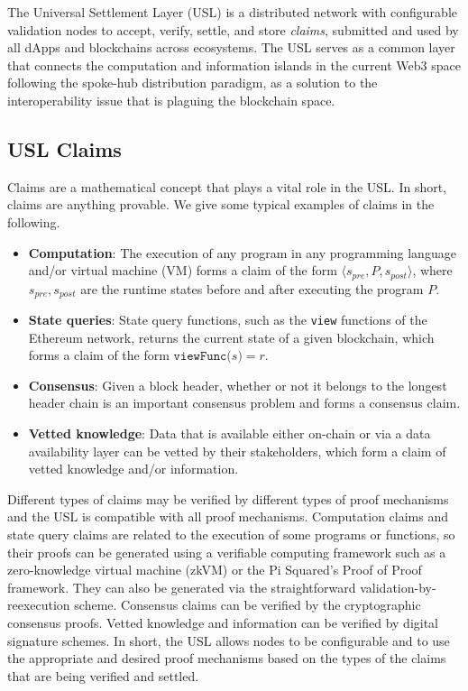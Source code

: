 \documentclass{article}
\newcommand{\spre}{s_\textit{pre}}
\newcommand{\spost}{s_\textit{post}}
\begin{document}
The Universal Settlement Layer (USL) is a distributed network with configurable validation nodes to accept, verify, settle, and store \emph{claims}, submitted and used by all dApps and blockchains across ecosystems. 
The USL serves as a common layer that connects the computation and information islands in the current Web3 space following the spoke-hub distribution paradigm,
as a solution to the interoperability issue that is plaguing the blockchain space. 

\subsection{USL Claims}
\label{sec:usl:claims}

Claims are a mathematical concept that plays a vital role in the USL. 
In short, claims are anything provable. 
We give some typical examples of claims in the following. 
\begin{itemize}
    \item \textbf{Computation}: The execution of any program in any programming language and/or virtual machine (VM) forms a claim of the form $\langle \spre , P , \spost \rangle$,
    where $\spre,\spost$ are the runtime states before and after executing the program $P$. 
    \item \textbf{State queries}: State query functions, such as the \texttt{view} functions of the Ethereum network,
    returns the current state of a given blockchain, which forms a claim of the form $\texttt{viewFunc($s$)} = r$.
    \item \textbf{Consensus}: Given a block header, whether or not it belongs to the longest header chain
    is an important consensus problem and forms a consensus claim. 
    \item \textbf{Vetted knowledge}: Data that is available either on-chain or via a data availability layer can be vetted by their stakeholders, which form a claim of vetted knowledge and/or information.  
\end{itemize}

Different types of claims may be verified by different types of proof mechanisms
and the USL is compatible with all proof mechanisms. 
Computation claims and state query claims are related to the execution of 
some programs or functions, so their proofs can be generated using a verifiable computing framework
such as a zero-knowledge virtual machine (zkVM) or the Pi Squared's Proof of Proof framework. 
They can also be generated via the straightforward validation-by-reexecution scheme. 
Consensus claims can be verified by the cryptographic consensus proofs. 
Vetted knowledge and information can be verified by digital signature schemes. 
In short, the USL allows nodes to be configurable and to use the appropriate and desired proof mechanisms 
based on the types of the claims that are being verified and settled. 
\end{document}
